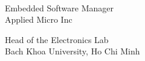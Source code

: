 \documentclass[12pt,a4paper]{altacv}
\begin{document}
 \\

{
	Embedded Software Manager \\
	Applied Micro Inc \\
}

\divider

{
	Head of the Electronics Lab \\
	Bach Khoa University, Ho Chi Minh \\
}
\end{document}
